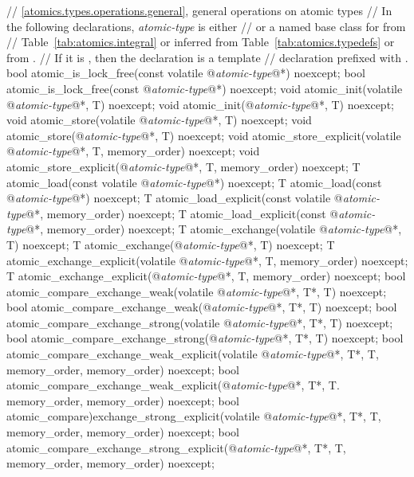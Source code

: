\begin{codeblock}
{  // \ref{atomics.types.operations.general}, general operations on atomic types
  //  In the following declarations, \textit{atomic-type} is either
  //   or a named base class for  from
  //  Table~\ref{tab:atomics.integral} or inferred from Table~\ref{tab:atomics.typedefs} or from .
  // If it is , then the declaration is a template
  // declaration prefixed with .
  bool atomic_is_lock_free(const volatile @\textit{atomic-type}@*) noexcept;
  bool atomic_is_lock_free(const @\textit{atomic-type}@*) noexcept;
  void atomic_init(volatile @\textit{atomic-type}@*, T) noexcept;
  void atomic_init(@\textit{atomic-type}@*, T) noexcept;
  void atomic_store(volatile @\textit{atomic-type}@*, T) noexcept;
  void atomic_store(@\textit{atomic-type}@*, T) noexcept;
  void atomic_store_explicit(volatile @\textit{atomic-type}@*, T, memory_order) noexcept;
  void atomic_store_explicit(@\textit{atomic-type}@*, T, memory_order) noexcept;
  T atomic_load(const volatile @\textit{atomic-type}@*) noexcept;
  T atomic_load(const @\textit{atomic-type}@*) noexcept;
  T atomic_load_explicit(const volatile @\textit{atomic-type}@*, memory_order) noexcept;
  T atomic_load_explicit(const @\textit{atomic-type}@*, memory_order) noexcept;
  T atomic_exchange(volatile @\textit{atomic-type}@*, T) noexcept;
  T atomic_exchange(@\textit{atomic-type}@*, T) noexcept;
  T atomic_exchange_explicit(volatile @\textit{atomic-type}@*, T, memory_order) noexcept;
  T atomic_exchange_explicit(@\textit{atomic-type}@*, T, memory_order) noexcept;
  bool atomic_compare_exchange_weak(volatile @\textit{atomic-type}@*, T*, T) noexcept;
  bool atomic_compare_exchange_weak(@\textit{atomic-type}@*, T*, T) noexcept;
  bool atomic_compare_exchange_strong(volatile @\textit{atomic-type}@*, T*, T) noexcept;
  bool atomic_compare_exchange_strong(@\textit{atomic-type}@*, T*, T) noexcept;
  bool atomic_compare_exchange_weak_explicit(volatile @\textit{atomic-type}@*, T*, T, 
    memory_order, memory_order) noexcept;
  bool atomic_compare_exchange_weak_explicit(@\textit{atomic-type}@*, T*, T.
    memory_order, memory_order) noexcept;
  bool atomic_compare)exchange_strong_explicit(volatile @\textit{atomic-type}@*, T*, T,
    memory_order, memory_order) noexcept;
  bool atomic_compare_exchange_strong_explicit(@\textit{atomic-type}@*, T*, T,
    memory_order, memory_order) noexcept;

}
\end{codeblock}
